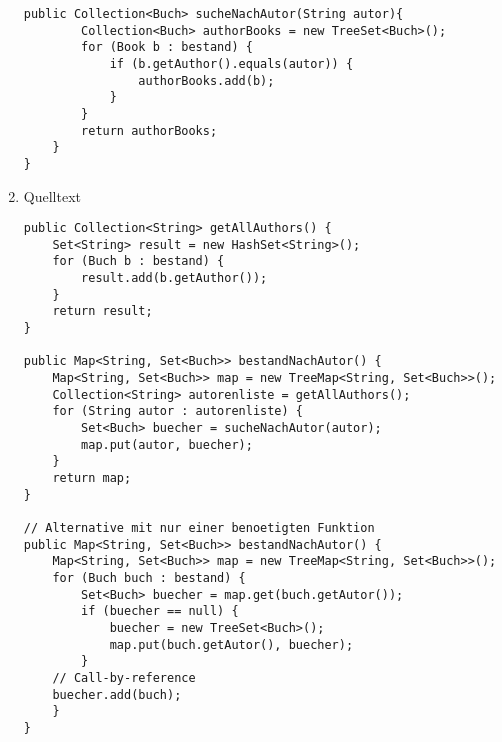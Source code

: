 \documentclass{article}
\begin{document}
\begin{enumerate}[label=(\alph*)]
\begin{lstlisting}[style=java,tabsize=2]
	public Collection<Buch> sucheNachAutor(String autor){
		Collection<Buch> authorBooks = new TreeSet<Buch>();
		for (Book b : bestand) {
			if (b.getAuthor().equals(autor)) {
				authorBooks.add(b);
			}
		}
		return authorBooks;
	} 
}
		\end{lstlisting}
		\item Quelltext
		\begin{lstlisting}[style=java,tabsize=2]
public Collection<String> getAllAuthors() {
	Set<String> result = new HashSet<String>();
	for (Buch b : bestand) {
		result.add(b.getAuthor());
	}
	return result;
}

public Map<String, Set<Buch>> bestandNachAutor() {
	Map<String, Set<Buch>> map = new TreeMap<String, Set<Buch>>();
	Collection<String> autorenliste = getAllAuthors();
	for (String autor : autorenliste) {
		Set<Buch> buecher = sucheNachAutor(autor);
		map.put(autor, buecher);
	}
	return map;
}

// Alternative mit nur einer benoetigten Funktion
public Map<String, Set<Buch>> bestandNachAutor() {
	Map<String, Set<Buch>> map = new TreeMap<String, Set<Buch>>();
	for (Buch buch : bestand) {
		Set<Buch> buecher = map.get(buch.getAutor());
		if (buecher == null) {
			buecher = new TreeSet<Buch>();
			map.put(buch.getAutor(), buecher);
		}
	// Call-by-reference
	buecher.add(buch);
	}
}
		\end{lstlisting}
	\end{enumerate}
\end{document}
